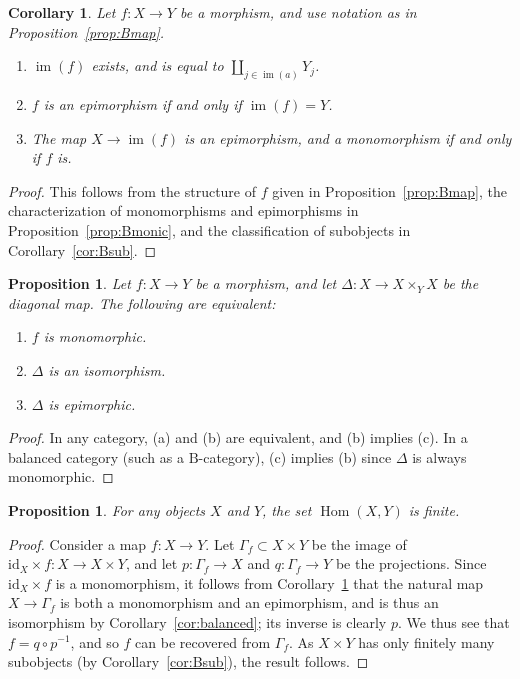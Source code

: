 \documentclass[12pt]{amsart}
\numberwithin{equation}{section}
\newtheorem{proposition}[equation]{Proposition}
\newtheorem{corollary}[equation]{Corollary}
\theoremstyle{definition}
\newcommand{\rB}{\mathrm{B}}
\DeclareMathOperator{\im}{im}
\DeclareMathOperator{\Hom}{Hom}
\newcommand{\id}{\mathrm{id}}
\begin{document}
\begin{corollary} \label{cor:im}
Let $f \colon X \to Y$ be a morphism, and use notation as in Proposition~\ref{prop:Bmap}.
\begin{enumerate}
\item $\im(f)$ exists, and is equal to $\coprod_{j \in \im(a)} Y_j$.
\item $f$ is an epimorphism if and only if $\im(f)=Y$.
\item The map $X \to \im(f)$ is an epimorphism, and a monomorphism if and only if $f$ is.
\end{enumerate}
\end{corollary}

\begin{proof}
This follows from the structure of $f$ given in Proposition~\ref{prop:Bmap}, the characterization of monomorphisms and epimorphisms in Proposition~\ref{prop:Bmonic}, and the classification of subobjects in Corollary~\ref{cor:Bsub}.
\end{proof}

\begin{proposition} \label{prop:mono}
Let $f \colon X \to Y$ be a morphism, and let $\Delta \colon X \to X \times_Y X$ be the diagonal map. The following are equivalent:
\begin{enumerate}
\item $f$ is monomorphic.
\item $\Delta$ is an isomorphism.
\item $\Delta$ is epimorphic.
\end{enumerate}
\end{proposition}

\begin{proof}
In any category, (a) and (b) are equivalent, and (b) implies (c). In a balanced category (such as a $\rB$-category), (c) implies (b) since $\Delta$ is always monomorphic.
\end{proof}

\begin{proposition} \label{prop:Hom-finite}
For any objects $X$ and $Y$, the set $\Hom(X,Y)$ is finite.
\end{proposition}

\begin{proof}
Consider a map $f \colon X \to Y$. Let $\Gamma_f \subset X \times Y$ be the image of $\id_X \times f \colon X \to X \times Y$, and let $p \colon \Gamma_f \to X$ and $q \colon \Gamma_f \to Y$ be the projections. Since $\id_X \times f$ is a monomorphism, it follows from Corollary~\ref{cor:im} that the natural map $X \to \Gamma_f$ is both a monomorphism and an epimorphism, and is thus an isomorphism by Corollary~\ref{cor:balanced}; its inverse is clearly $p$. We thus see that $f=q \circ p^{-1}$, and so $f$ can be recovered from $\Gamma_f$. As $X \times Y$ has only finitely many subobjects (by Corollary~\ref{cor:Bsub}), the result follows.
\end{proof}
\end{document}
